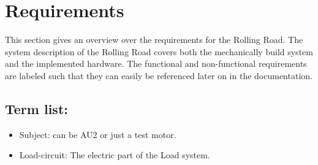 \chapter{Requirements}
This section gives an overview over the requirements for the Rolling Road. The system description of the Rolling Road covers both the mechanically build system and the implemented hardware. The functional and non-functional requirements are labeled such that they can easily be referenced later on in the documentation.

\section{Term list:}
\begin{itemize}
	\item Subject: can be AU2 or just a test motor.
	\item Load-circuit: The electric part of the Load system.
\end{itemize}


